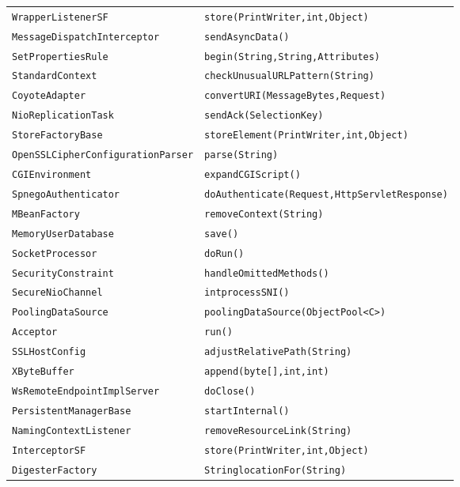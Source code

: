 \begin{center}
\begin{longtable}{ll}
 \lstinline/WrapperListenerSF/&{\lstinline/store(PrintWriter,int,Object)/}\\
 \lstinline/MessageDispatchInterceptor/&{\lstinline/sendAsyncData()/}\\
 \lstinline/SetPropertiesRule/&{\lstinline/begin(String,String,Attributes)/}\\
 \lstinline/StandardContext/&{\lstinline/checkUnusualURLPattern(String)/}\\
 \lstinline/CoyoteAdapter/&{\lstinline/convertURI(MessageBytes,Request)/}\\
 \lstinline/NioReplicationTask/&{\lstinline/sendAck(SelectionKey)/}\\
 \lstinline/StoreFactoryBase/&{\lstinline/storeElement(PrintWriter,int,Object)/}\\
 \lstinline/OpenSSLCipherConfigurationParser/&{\lstinline/parse(String)/}\\
 \lstinline/CGIEnvironment/&{\lstinline/expandCGIScript()/}\\
 \lstinline/SpnegoAuthenticator/&{\lstinline/doAuthenticate(Request,HttpServletResponse)/}\\
 \lstinline/MBeanFactory/&{\lstinline/removeContext(String)/}\\
 \lstinline/MemoryUserDatabase/&{\lstinline/save()/}\\
 \lstinline/SocketProcessor/&{\lstinline/doRun()/}\\
 \lstinline/SecurityConstraint/&{\lstinline/handleOmittedMethods()/}\\
 \lstinline/SecureNioChannel/&{\lstinline/intprocessSNI()/}\\
 \lstinline/PoolingDataSource/&{\lstinline/poolingDataSource(ObjectPool<C>)/}\\
 \lstinline/Acceptor/&{\lstinline/run()/}\\
 \lstinline/SSLHostConfig/&{\lstinline/adjustRelativePath(String)/}\\
 \lstinline/XByteBuffer/&{\lstinline/append(byte[],int,int)/}\\
 \lstinline/WsRemoteEndpointImplServer/&{\lstinline/doClose()/}\\
 \lstinline/PersistentManagerBase/&{\lstinline/startInternal()/}\\
 \lstinline/NamingContextListener/&{\lstinline/removeResourceLink(String)/}\\
 \lstinline/InterceptorSF/&{\lstinline/store(PrintWriter,int,Object)/}\\
 \lstinline/DigesterFactory/&{\lstinline/StringlocationFor(String)/}\\

\end{longtable}
\end{center}
